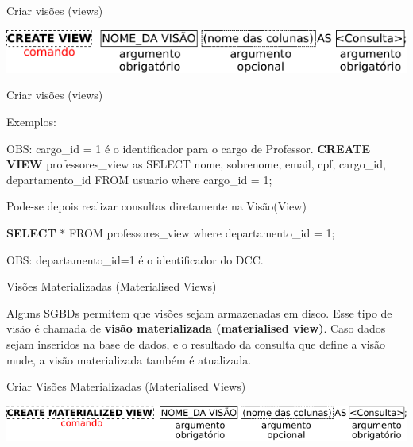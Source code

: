 \documentclass[xcolor=x11names,compress]{beamer}
\begin{document}
\begin{frame}{Criar visões (views)}

\centering \includegraphics[keepaspectratio,width=\textwidth]{create_view}

\end{frame}

\begin{frame}{Criar visões (views)}

Exemplos:

\begin{alertblock}{OBS: cargo\_id = 1 é o identificador para o cargo de Professor.}
\textbf{CREATE VIEW} professores\_view as SELECT nome, sobrenome, email, cpf, cargo\_id, departamento\_id FROM usuario where cargo\_id = 1;
\end{alertblock}


\pause

\begin{alertblock}{Pode-se depois realizar consultas diretamente na Visão(View)}

\textbf{SELECT} * FROM professores\_view where departamento\_id = 1;

\end{alertblock}

\begin{alertblock}{OBS: departamento\_id=1 é o identificador do DCC.}
\end{alertblock}

\end{frame}

\begin{frame}{Visões Materializadas (Materialised Views)}

Alguns SGBDs permitem que visões sejam armazenadas em disco. Esse tipo de visão é chamada de \textbf{visão materializada (materialised view)}. Caso dados sejam inseridos na base de dados, e o resultado da consulta que define a visão mude, a visão materializada também é atualizada.

\end{frame}

\begin{frame}{Criar Visões Materializadas (Materialised Views)}

\centering \includegraphics[keepaspectratio,width=\textwidth]{create_materialised_view}

\end{frame}
\end{document}
